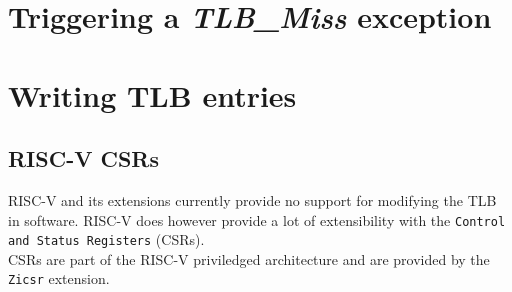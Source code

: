 \section{Triggering a \textit{TLB\_Miss} exception}



\section{Writing TLB entries}
\subsection{RISC-V CSRs}
RISC-V and its extensions currently provide no support for modifying the TLB in software.
RISC-V does however provide a lot of extensibility with the \texttt{Control and Status Registers} (CSRs).\\
CSRs are part of the RISC-V priviledged architecture and are provided by the \texttt{Zicsr} extension\cite{RISCVInstructionSet}.\\


